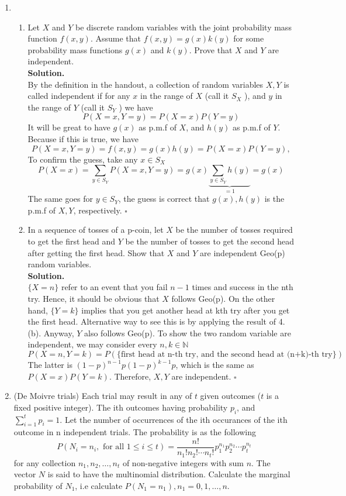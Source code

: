 \documentclass[12pt]{article}
\begin{document}
\begin{enumerate}
\item
\begin{enumerate}
\item
Let $X$ and $Y$ be discrete random variables with the joint probability mass function $f(x,y)$. Assume that $f(x,y)=g(x)k(y)$ for some
probability mass functions $g(x)$ and $k(y)$. Prove that $X$ and $Y$ are independent.\\
\textbf{Solution.}\\ 
By the definition in the handout, a collection of random variables \(X,Y \) is called independent if for any \(x\) in the range of \(X\) (call it \(S_X\) ), and \(y\) in the range of \(Y\) (call it \(S_Y\) ) we have
\[
    P(X =x, Y = y) = P(X = x)P(Y = y)
\]
It will be great to have \(g(x)\) as p.m.f of \(X\), and \(h(y)\) as p.m.f of \(Y\). Because if this is true, we have 
\[
    P(X = x, Y = y) = f(x,y) = g(x)h(y) = P(X= x)P(Y = y),
\] 
To confirm the guess, take any \(x\in S_X\)
\[
    P(X = x) =  \sum_{y\in S_Y}P(X =x, Y = y) = g(x) \underbrace{\sum_{y\in S_Y}h(y) }_{=1} = g(x)
\]  
The same goes for \(y\in S_Y\), the guess is correct that \(g(x), h(y)\) is the p.m.f of \(X, Y\), respectively. \(\square\)  

\item In a sequence of tosses of a p-coin, let $X$ be the number of tosses required to get the first head and $Y$ be the number of tosses to get the second head after getting the first head. Show that $X$ and $Y$ are independent Geo(p) random variables.\\
\textbf{Solution.}  \\
\(\{X = n\}\) refer to an event that you fail \(n-1\) times and success in the nth try. Hence, it should be obvious that \(X\) follows Geo(p). 
On the other hand, \(\{Y = k\}\) implies that you get another head at kth try after you get the first head. Alternative way to see this is by applying the result of  4.(b). Anyway, \( Y\) also follows Geo(p).   
To show the two random variable are independent, we may consider every \(n,k \in \mathbb{N}\) 
\[
    P(X = n, Y = k) = P(\{\text{first head at n-th try, and the second head at (n+k)-th try} \}) 
\]
The latter is \((1-p)^{n-1}p(1-p)^{k-1}p\), which is the same as \(P(X=x)P(Y =k)\). Therefore, \(X,Y\) are independent. \(\square\)   
\end{enumerate}

\item
(De Moivre trials) Each trial may result in any of \(t\) given outcomes (\(t\) is a fixed positive integer). The ith outcomes having probability \(p_i\), and \(\sum_{i=1}^{t} p_i  = 1\).
Let the number of occurrences of the ith occurances of the ith outcome in n independent trials. The probability is as the following
\[
    P(N_i = n_i, \text{ for all } 1 \leq i \leq t) = \frac{n!}{n_1!n_2!\cdots n_t!}p_1^{n_1}p_2^{n_2} \cdots p_t^{n_t}
\]
for any collection \(n_1, n_2, \dots, n_t\) of non-negative integers with sum \(n\). The vector \(N\) is said to have the multinomial distribution.
Calculate the marginal probability of \(N_1\), i.e calculate \(P(N_1 = n_1), n_1 = 0,1,\dots,n\).


\end{enumerate}
\end{document}
